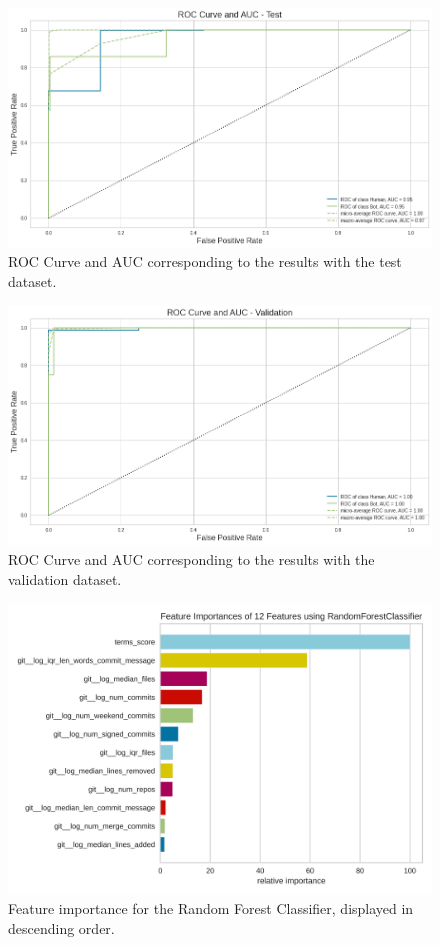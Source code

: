 \documentclass[a4paper, 12pt]{book}
\begin{document}
\begin{figure}
 \centering
  \includegraphics[width=16cm, keepaspectratio]{img/roc-auc-test.png}
  \caption{ROC Curve and AUC corresponding to the results with the test dataset.}
  \label{fig:roc-auc-test}
\end{figure}

\begin{figure}
 \centering
  \includegraphics[width=16cm, keepaspectratio]{img/roc-auc-validation.png}
  \caption{ROC Curve and AUC corresponding to the results with the validation dataset.}
  \label{fig:roc-auc-val}
\end{figure}

\begin{figure}
 \centering
  \includegraphics[width=16cm, keepaspectratio]{img/rf-feature-importances.png}
  \caption{Feature importance for the Random Forest Classifier, displayed in descending order.}
  \label{fig:rf-feature-importance}
\end{figure}
\end{document}
